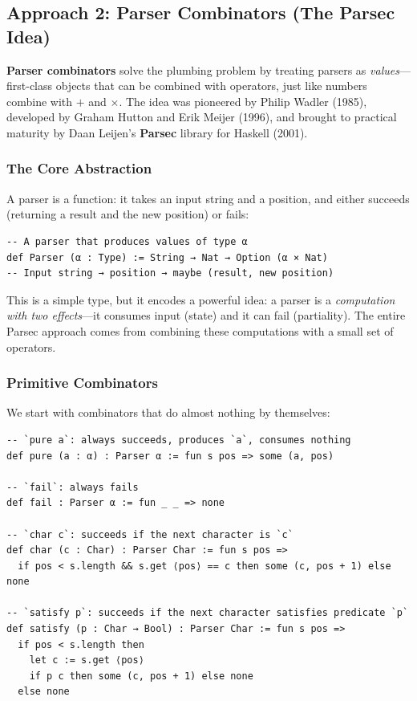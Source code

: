 \documentclass[11pt,a4paper]{article}
\theoremstyle{definition}
\begin{document}
\subsection{Approach 2: Parser Combinators (The Parsec Idea)}

\textbf{Parser combinators} solve the plumbing problem by treating parsers as
\emph{values}---first-class objects that can be combined with operators, just
like numbers combine with $+$ and $\times$. The idea was pioneered by Philip
Wadler (1985), developed by Graham Hutton and Erik Meijer (1996), and brought
to practical maturity by Daan Leijen's \textbf{Parsec} library for Haskell
(2001).

\subsubsection{The Core Abstraction}

A parser is a function: it takes an input string and a position, and either
succeeds (returning a result and the new position) or fails:

\begin{verbatim}
-- A parser that produces values of type α
def Parser (α : Type) := String → Nat → Option (α × Nat)
-- Input string → position → maybe (result, new position)
\end{verbatim}

This is a simple type, but it encodes a powerful idea: a parser is a
\emph{computation with two effects}---it consumes input (state) and it can
fail (partiality). The entire Parsec approach comes from combining these
computations with a small set of operators.

\subsubsection{Primitive Combinators}

We start with combinators that do almost nothing by themselves:

\begin{verbatim}
-- `pure a`: always succeeds, produces `a`, consumes nothing
def pure (a : α) : Parser α := fun s pos => some (a, pos)

-- `fail`: always fails
def fail : Parser α := fun _ _ => none

-- `char c`: succeeds if the next character is `c`
def char (c : Char) : Parser Char := fun s pos =>
  if pos < s.length && s.get ⟨pos⟩ == c then some (c, pos + 1) else none

-- `satisfy p`: succeeds if the next character satisfies predicate `p`
def satisfy (p : Char → Bool) : Parser Char := fun s pos =>
  if pos < s.length then
    let c := s.get ⟨pos⟩
    if p c then some (c, pos + 1) else none
  else none
\end{verbatim}
\end{document}
